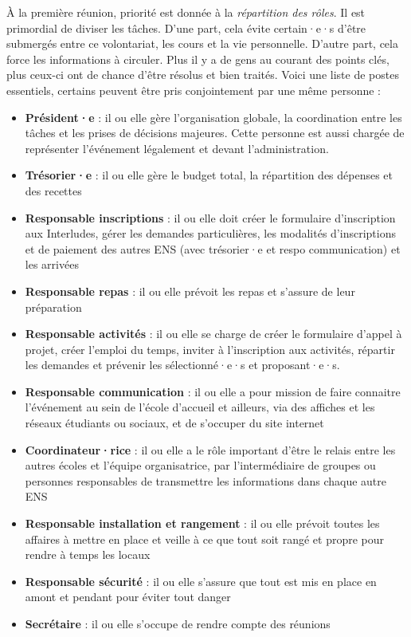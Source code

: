 À la première réunion, priorité est donnée à la \emph{répartition des rôles}. Il est primordial de diviser les tâches. D'une part, cela évite certain·e·s d'être submergés entre ce volontariat, les cours et la vie personnelle. D'autre part, cela force les informations à circuler. Plus il y a de gens au courant des points clés, plus ceux-ci ont de chance d'être résolus et bien traités. Voici une liste de postes essentiels, certains peuvent être pris conjointement par une même personne :
\begin{itemize}
    \item \textbf{Président·e} : il ou elle  gère l'organisation globale, la coordination entre les tâches et les prises de décisions majeures. Cette personne est aussi chargée de représenter l'événement légalement et devant l'administration.
    \item \textbf{Trésorier·e} : il ou elle gère le budget total, la répartition des dépenses et des recettes
    \item \textbf{Responsable inscriptions} : il ou elle doit créer le formulaire d'inscription aux Interludes, gérer les demandes particulières, les modalités d'inscriptions et de paiement des autres ENS (avec trésorier·e et respo communication) et les arrivées
    \item \textbf{Responsable repas} : il ou elle prévoit les repas et s'assure de leur préparation
    \item \textbf{Responsable activités} : il ou elle se charge de créer le formulaire d'appel à projet, créer l'emploi du temps, inviter à l'inscription aux activités, répartir les demandes et prévenir les sélectionné·e·s et proposant·e·s.
    \item \textbf{Responsable communication} : il ou elle a pour mission de faire connaitre l'événement au sein de l'école d'accueil et ailleurs, via des affiches et les réseaux étudiants ou sociaux, et de s'occuper du site internet
    \item \textbf{Coordinateur·rice} : il ou elle a le rôle important d'être le relais entre les autres écoles et l'équipe organisatrice, par l'intermédiaire de groupes ou personnes responsables de transmettre les informations dans chaque autre ENS
    \item \textbf{Responsable installation et rangement} : il ou elle prévoit toutes les affaires à mettre en place et veille à ce que tout soit rangé et propre pour rendre à temps les locaux
    \item \textbf{Responsable sécurité} : il ou elle s'assure que tout est mis en place en amont et pendant pour éviter tout danger
    \item \textbf{Secrétaire} : il ou elle s'occupe de rendre compte des réunions
\end{itemize}


